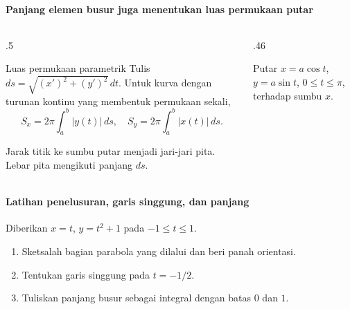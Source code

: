 \documentclass{../../kalkulus-ppt}
\begin{document}
\begin{frame}{\insertsection}
    \framesubtitle{Panjang elemen busur juga menentukan luas permukaan putar}
    \begin{columns}[c,onlytextwidth]
        \begin{column}{.5\textwidth}
            \begin{block}{Luas permukaan parametrik}
                Tulis $ds=\sqrt{(x')^2+(y')^2}\,dt$.
                Untuk kurva dengan turunan kontinu yang
                membentuk permukaan sekali,
                \[
                    S_x=2\pi\int_a^b |y(t)|\,ds,\quad
                    S_y=2\pi\int_a^b |x(t)|\,ds.
                \]
            \end{block}
            Jarak titik ke sumbu putar menjadi jari-jari pita.
            Lebar pita mengikuti panjang $ds$.
        \end{column}
        \begin{column}{.46\textwidth}
            \begin{contoh}
                Putar $x=a\cos t$, $y=a\sin t$,
                $0\le t\le\pi$, terhadap sumbu $x$.
            \end{contoh}
        \end{column}
    \end{columns}
\end{frame}

\begin{frame}{\insertsection}
    \framesubtitle{Latihan penelusuran, garis singgung, dan panjang}
    \begin{latihan}
        Diberikan $x=t$, $y=t^2+1$ pada $-1\le t\le1$.
        \begin{enumerate}
            \item Sketsalah bagian parabola yang dilalui dan beri panah orientasi.
            \item Tentukan garis singgung pada $t=-1/2$.
            \item Tuliskan panjang busur sebagai integral dengan batas $0$ dan $1$.
        \end{enumerate}
    \end{latihan}
\end{frame}
\end{document}

